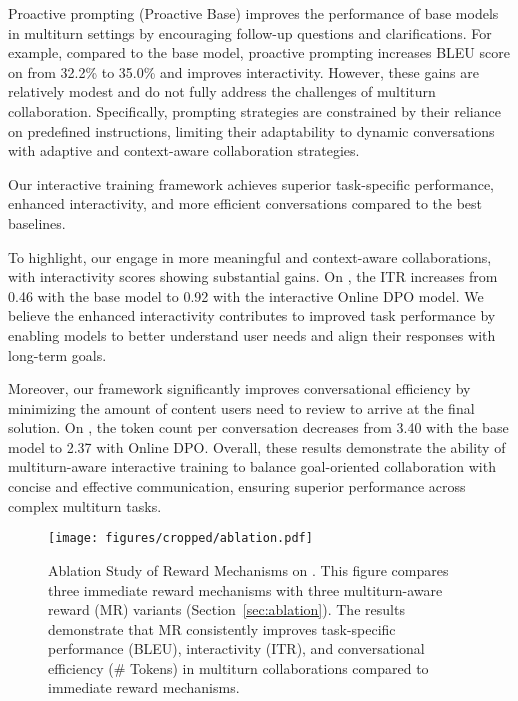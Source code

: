 Proactive prompting (\ie Proactive Base) improves the performance of base models in multiturn settings by encouraging follow-up questions and clarifications. 
For example, compared to the base model, proactive prompting increases BLEU score on \doc from 32.2\% to 35.0\% and improves interactivity. However, these gains are relatively modest and do not fully address the challenges of multiturn collaboration. 
Specifically, prompting strategies are constrained by their reliance on predefined instructions, limiting their adaptability to dynamic conversations with adaptive and context-aware collaboration strategies.

Our interactive training framework achieves \taskimprov superior task-specific performance, \itrimprov enhanced interactivity, and \efficiencyimprov more efficient conversations compared to the best baselines.

To highlight, our \objects engage in more meaningful and context-aware collaborations, with interactivity scores showing substantial gains. On \doct, the ITR increases from 0.46 with the base model to 0.92 with the interactive Online DPO model. We believe the enhanced interactivity contributes to improved task performance by enabling models to better understand user needs and align their responses with long-term goals.

Moreover, our framework significantly improves conversational efficiency by minimizing the amount of content users need to review to arrive at the final solution. On \mathct, the token count per conversation decreases from 3.40 with the base model to 2.37 with Online DPO. Overall, these results demonstrate the ability of multiturn-aware interactive training to balance goal-oriented collaboration with concise and effective communication, ensuring superior performance across complex multiturn tasks.


\begin{figure*}[t]
    \centering
    \texttt{[image: figures/cropped/ablation.pdf]}
    \vspace{-5pt}
    \caption{Ablation Study of Reward Mechanisms on \doct. This figure compares three immediate reward mechanisms with three multiturn-aware reward (MR) variants (\cf Section~\ref{sec:ablation}). The results demonstrate that MR consistently improves task-specific performance (BLEU), interactivity (ITR), and conversational efficiency (\# Tokens) in multiturn collaborations compared to immediate reward mechanisms.}
    \label{fig:ablation}
\end{figure*}

